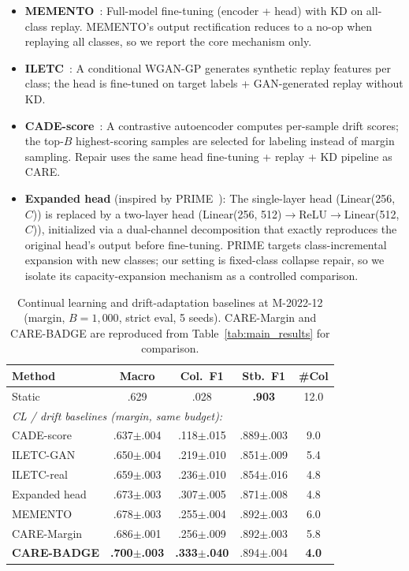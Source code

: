 \documentclass[journal]{IEEEtran}
\newcommand{\ours}{CARE}  %
\begin{document}
\begin{itemize}
  \item \textbf{MEMENTO}~\cite{cerasuolo2024memento}: Full-model fine-tuning (encoder + head) with KD on all-class replay. MEMENTO's output rectification reduces to a no-op when replaying all classes, so we report the core mechanism only.
  \item \textbf{ILETC}~\cite{zhu2023iletc}: A conditional WGAN-GP generates synthetic replay features per class; the head is fine-tuned on target labels + GAN-generated replay without KD.
  \item \textbf{CADE-score}~\cite{yang2021cade}: A contrastive autoencoder computes per-sample drift scores; the top-$B$ highest-scoring samples are selected for labeling instead of margin sampling. Repair uses the same head fine-tuning + replay + KD pipeline as \ours{}.
  \item \textbf{Expanded head} (inspired by PRIME~\cite{prime2025}): The single-layer head (Linear(256, $C$)) is replaced by a two-layer head (Linear(256, 512)$\to$ReLU$\to$Linear(512, $C$)), initialized via a dual-channel decomposition that exactly reproduces the original head's output before fine-tuning. PRIME targets class-incremental expansion with new classes; our setting is fixed-class collapse repair, so we isolate its capacity-expansion mechanism as a controlled comparison.
\end{itemize}

\begin{table}[t]
\centering
\caption{Continual learning and drift-adaptation baselines at M-2022-12 (margin, $B{=}1{,}000$, strict eval, 5 seeds). \ours{}-Margin and \ours{}-BADGE are reproduced from Table~\ref{tab:main_results} for comparison.}
\label{tab:cl_baselines}
\scriptsize
\setlength{\tabcolsep}{3pt}
\begin{tabular}{@{}l cccc@{}}
\toprule
Method & Macro & Col.\ F1 & Stb.\ F1 & \#Col \\
\midrule
Static & .629 & .028 & \textbf{.903} & 12.0 \\
\midrule
\multicolumn{5}{l}{\textit{CL / drift baselines (margin, same budget):}} \\
CADE-score~\cite{yang2021cade}     & .637$\pm$.004 & .118$\pm$.015 & .889$\pm$.003 & 9.0 \\
ILETC-GAN~\cite{zhu2023iletc}     & .650$\pm$.004 & .219$\pm$.010 & .851$\pm$.009 & 5.4 \\
ILETC-real                         & .659$\pm$.003 & .236$\pm$.010 & .854$\pm$.016 & 4.8 \\
Expanded head                      & .673$\pm$.003 & .307$\pm$.005 & .871$\pm$.008 & 4.8 \\
MEMENTO~\cite{cerasuolo2024memento}& .678$\pm$.003 & .255$\pm$.004 & .892$\pm$.003 & 6.0 \\
\midrule
\ours{}-Margin & .686$\pm$.001 & .256$\pm$.009 & .892$\pm$.003 & 5.8 \\
\textbf{\ours{}-BADGE} & \textbf{.700$\pm$.003} & \textbf{.333$\pm$.040} & .894$\pm$.004 & \textbf{4.0} \\
\bottomrule
\end{tabular}
\end{table}
\end{document}
